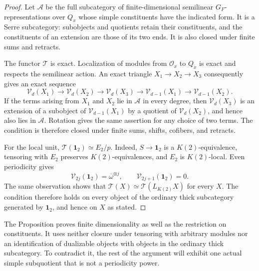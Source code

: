 \begin{proof}
Let \(\mathcal A\) be the full subcategory of finite-dimensional semilinear
\(G_F\)-representations over \(Q_x\) whose simple constituents have the
indicated form. It is a Serre subcategory: subobjects and quotients retain
their constituents, and the constituents of an extension are those of its
two ends. It is also closed under finite sums and retracts.

The functor \(\mathcal T\) is exact. Localization of modules from
\(\mathcal O_x\) to \(Q_x\) is exact and respects the semilinear action.
An exact triangle \(X_1\to X_2\to X_3\) consequently gives an exact sequence
\[
 \mathcal V_d(X_1)\longrightarrow\mathcal V_d(X_2)
 \longrightarrow\mathcal V_d(X_3)
 \longrightarrow\mathcal V_{d-1}(X_1)
 \longrightarrow\mathcal V_{d-1}(X_2).
\]
If the terms arising from \(X_1\) and \(X_2\) lie in \(\mathcal A\) in
every degree, then \(\mathcal V_d(X_3)\) is an extension of a subobject of
\(\mathcal V_{d-1}(X_1)\) by a quotient of \(\mathcal V_d(X_2)\), and
hence also lies in \(\mathcal A\). Rotation gives the same assertion for
any choice of two terms. The condition is therefore closed under finite
sums, shifts, cofibers, and retracts.

For the local unit, \(\mathcal T(\mathbf 1_2)\simeq E_2/p\). Indeed,
\(S\to\mathbf 1_2\) is a \(K(2)\)-equivalence, tensoring with \(E_2\)
preserves \(K(2)\)-equivalences, and \(E_2\) is \(K(2)\)-local. Even
periodicity gives
\[
 \mathcal V_{2j}(\mathbf 1_2)=\overline\omega^{\otimes j},
 \qquad \mathcal V_{2j+1}(\mathbf 1_2)=0.
\]
The same observation shows that
\(\mathcal T(X)\simeq\mathcal T(L_{K(2)}X)\) for every \(X\). The condition
therefore holds on every object of the ordinary thick subcategory generated
by \(\mathbf 1_2\), and hence on \(X\) as stated.
\end{proof}

The Proposition proves finite dimensionality as well as the restriction on
constituents. It uses neither closure under tensoring with arbitrary
modules nor an identification of dualizable objects with objects in the
ordinary thick subcategory. To contradict it, the rest of the argument
will exhibit one actual simple subquotient that is not a periodicity power.
